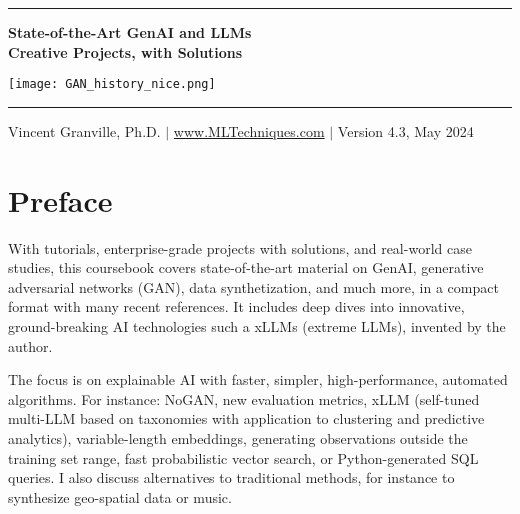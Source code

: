 \documentclass[oneside,10pt]{book}
\begin{document}
\hypersetup{linkcolor=blue}

\baselineskip
\thispagestyle{empty}
\hspace{0pt}
\vfill
\begin{center}
\rule{0.90\textwidth}{.4pt}
\end{center}

\begin{center}
{\Huge \bf{State-of-the-Art GenAI and LLMs\\\vspace{0.5ex}Creative Projects, with Solutions} }  
\end{center}


\baselineskip
\addvspace{2cm}
\begin{center}
\texttt{[image: GAN\_history\_nice.png]}  
\end{center}
\addvspace{2cm}
\begin{center}
\rule{0.90\textwidth}{.4pt}
\end{center}
\begin{center}
Vincent Granville, Ph.D. $|$ \href{https://mltechniques.com/}{www.MLTechniques.com} $|$ Version 4.3, May 2024 
\end{center}

\hypersetup{linkcolor=red} %

\vfill
\hspace{0pt}
\pagebreak

\chapter*{Preface} %

With tutorials, enterprise-grade projects with solutions, and real-world case studies, this coursebook covers state-of-the-art material on GenAI, generative adversarial networks (GAN), data synthetization, and much more, in a compact format with many recent references. It includes deep dives into innovative, ground-breaking AI technologies such a xLLMs (extreme LLMs), invented by the author. 

The focus is on explainable AI with faster, simpler, high-performance, automated algorithms. For instance: NoGAN, new evaluation metrics, xLLM (self-tuned multi-LLM based on taxonomies with application to clustering and predictive analytics), variable-length embeddings, generating observations outside the training set range, fast probabilistic vector search, or Python-generated SQL queries. I also discuss alternatives to traditional methods, for instance to synthesize geo-spatial data or music. 
\end{document}
